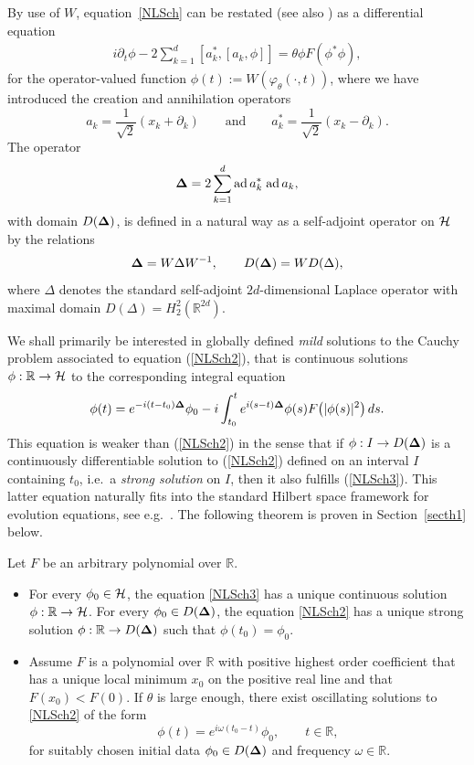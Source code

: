 \documentclass[pdftex]{sigma}
\begin{document}
By use of $W$, equation~\eqref{NLSch} can be restated (see also \cite{DJN})
as a dif\/ferential equation
\begin{gather}
\label{NLSch2}
i\partial_t\phi - 2 \sum_{k=1}^d[a_k^*,[a_k,\phi]] =\theta \phi F(\phi^*\phi) ,
\end{gather}
 for  the operator-valued function $\phi(t) := W(\varphi_\theta(\cdot,t))$,
where we have introduced the creation and annihilation operators
\[
a_k =\frac{1}{\sqrt 2}(x_k + \partial_k)\qquad\mbox{and}\qquad a_k^* =
\frac{1}{\sqrt 2}(x_k - \partial_k) .
\]
The operator
\[
{\bf \Delta} = 2 \sum_{k=1}^d \mbox{ad}\, a_k^*\;\mbox{ad}\, a_k,
\]
with domain $D({\bf\Delta})$,
is def\/ined in a natural way as a self-adjoint operator on $\cal H$ by the
relations
\begin{gather}
\label{tria}
{\bf \Delta} =  W\Delta W^{-1} ,\qquad D({\bf \Delta})=WD(\Delta) ,
\end{gather}
where $\Delta$ denotes the standard self-adjoint $2d$-dimensional Laplace
operator with maximal domain $D(\Delta)=H_2^2(\mathbb R^{2d})$.

We shall primarily be interested in globally def\/ined \emph{mild}
solutions to the Cauchy problem associated to
equation (\ref{NLSch2}), that is continuous solutions $\phi:\mathbb
R\to{\cal H}$ to the corresponding integral equation
\begin{gather}
\label{NLSch3}
\phi(t) = e^{-i(t-t_0){\bf \Delta}}\phi_0 - i\int_{t_0}^t e^{i(s-t){\bf \Delta}}
\phi(s) F\big(|\phi(s)|^2\big)\,ds .
\end{gather}
This equation is weaker than (\ref{NLSch2}) in the sense that if
$\phi: I\to D({\bf \Delta})$ is a continuously dif\/ferentiable solution to
(\ref{NLSch2}) def\/ined on an interval $I$ containing $t_0$, i.e.\ a
\emph{strong solution} on $I$, then it also fulf\/ills (\ref{NLSch3}).
This latter equation  naturally f\/its into
the standard Hilbert space framework for evolution equations, see
e.g.~\cite{RS,Reed}. The following theorem is proven in Section~\ref{secth1}
below.

\begin{theorem}\label{th1} Let $F$ be an arbitrary polynomial over
  $\mathbb R$.
\begin{itemize}\itemsep=0pt
\item[$a)$]  For every $\phi_0\in{\cal H}$, the
equation \eqref{NLSch3} has a unique continuous
solution $\phi:\mathbb R\to {\cal H}$.  For every $\phi_0\in D({\bf\Delta})$, the
equation \eqref{NLSch2} has a unique strong
solution $\phi:\mathbb R\to D({\bf\Delta})$ such that $\phi(t_0)=\phi_0$.
\item[$b)$]  Assume $F$ is a polynomial over $\mathbb R$ with positive
highest order coefficient that has a unique local minimum $x_0$ on the
positive  real line and that $F(x_0)< F(0)$.
If $\theta$ is large enough, there exist oscillating solutions to
\eqref{NLSch2} of the form
\[
\phi(t) = e^{i\omega(t_0-t)}\phi_0 ,\qquad t\in\mathbb R ,
\]
for suitably chosen initial data $\phi_0\in D({\bf\Delta})$ and frequency
$\omega\in\mathbb R$.
\end{itemize}
\end{theorem}
\end{document}

